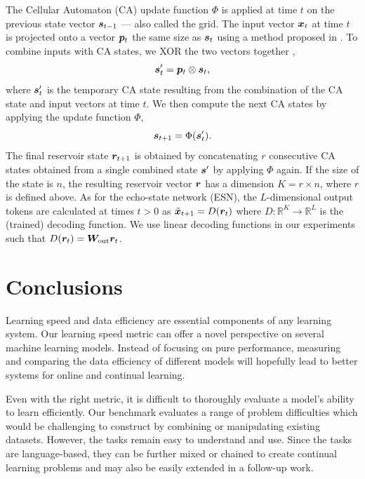 The Cellular Automaton (CA) update function $\Phi$ is applied at time $t$ on the previous state vector
${\bm{s}}_{t - 1}$ --- also called the grid. The input vector ${\bm{x}}_{t}$ at time $t$ is
projected onto a vector ${\bm{p}}_{t}$ the same size as ${\bm{s}}_{t}$ using a method proposed in
\parencite{yilmazReservoirComputingUsing2014}. To combine inputs with CA states,
we XOR the two vectors together
\parencite{gloverDynamicalLandscapeReservoir2021},
\begin{equation}
  \label{eq:ca-xor}
  {\bm{s}}'_{t} = {\bm{p}}_{t}\otimes {\bm{s}}_{t},
\end{equation}
where ${\bm{s}}'_{t}$ is the temporary CA state resulting from the combination of the
CA state and input vectors at time $t$. We then compute the next CA states by
applying the update function $\Phi$,
\begin{equation}
  \label{eq:ca-state}
  {\bm{s}}_{t + 1} = \Phi({\bm{s}}'_{t}).
\end{equation}
The final reservoir state ${\bm{r}}_{t + 1}$ is obtained by concatenating $r$ consecutive CA
states obtained from a single combined state ${\bm{s}}'$ by applying $\Phi$ again. If
the size of the state is $n$, the resulting reservoir vector ${\bm{r}}$ has a dimension
$K = r \times n$, where $r$ is defined above. As for the echo-state network (ESN), the $L$-dimensional output tokens are
calculated at times $t > 0$ as $\tilde{{\bm{x}}}_{t+ 1} = D({\bm{r}}_{t})$ where
$D: \mathbb{R}^{K} \rightarrow \mathbb{R}^{L}$ is the (trained) decoding function. We use linear decoding functions in
our experiments such that $D({\bm{r}}_{t}) = {\bm{W}}_{\text{out}}{\bm{r}}_{t}$.

\section{Conclusions}

Learning speed and data efficiency are essential components of any learning
system. Our learning speed metric can offer a novel perspective on several
machine learning models.
Instead of focusing on pure performance, measuring and comparing the data
efficiency of different models will hopefully lead to better systems for online
and continual learning.


Even with the right metric, it is difficult to thoroughly evaluate a model's
ability to learn efficiently. Our benchmark evaluates a range of problem
difficulties which would be challenging to construct by combining or
manipulating existing datasets.
However, the tasks remain easy to understand and use. Since the tasks are
language-based, they can be further mixed or chained to create continual
learning problems and may also be easily extended in a follow-up work.


